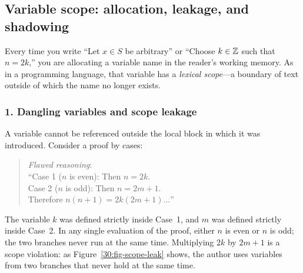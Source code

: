 \subsection{Variable scope: allocation, leakage, and shadowing}

Every time you write ``Let $x \in S$ be arbitrary'' or ``Choose $k \in \mathbb{Z}$ such that $n = 2k$,'' you are allocating a variable name in the reader's working memory. As in a programming language, that variable has a \emph{lexical scope}---a boundary of text outside of which the name no longer exists.

\subsubsection{1. Dangling variables and scope leakage}
A variable cannot be referenced outside the local block in which it was introduced.
Consider a proof by cases:
\begin{quote}
\emph{Flawed reasoning}:\\
``Case 1 ($n$ is even): Then $n = 2k$.\\
Case 2 ($n$ is odd): Then $n = 2m + 1$.\\
Therefore $n(n+1) = 2k(2m+1) \dots$''
\end{quote}
The variable $k$ was defined strictly inside Case~1, and $m$ was defined strictly inside Case~2. In any single evaluation of the proof, either $n$ is even or $n$ is odd; the two branches never run at the same time. Multiplying $2k$ by $2m+1$ is a scope violation: as Figure~\ref{30:fig-scope-leak} shows, the author uses variables from two branches that never hold at the same time.

